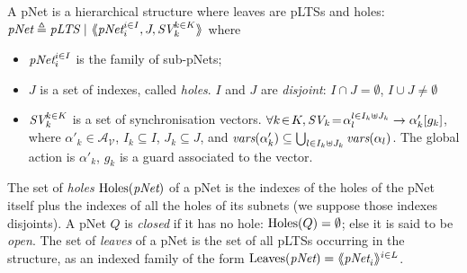 \documentclass{llncs}
\newcommand{\cA}{\ensuremath{\mathcal{A}}}
\newcommand{\cV}{\ensuremath{\mathcal{V}}}
\newcommand{\variables}{\ensuremath{\cV}}
\newcommand{\actions}[1]{\ensuremath{\cA_{#1}}}
\begin{document}
\begin{definition}[pNets]\label{defn:pnets}
A pNet is a hierarchical structure where leaves are pLTSs and holes: %
$\pNet\triangleq \pLTS~|~\mylangle \pNet_i^{i\in I}, J, \symb{SV}_k^{k\in 
K}\myrangle$
where
\begin{itemize}
\item $\pNet_i^{i\in I}$ is the family of sub-pNets;

\item $J$ is a set of indexes, called \emph{holes}.
$I$ and $J$ are \emph{disjoint}: $I\!\cap\! J=\emptyset$,  $I\!\cup\! J\neq\emptyset$

\item $\symb{SV}_k^{k\in K}$ is a set of
  synchronisation vectors. %
$\forall k\!\in\! K,
  \symb{SV}_k\!=\SV{\!\alpha_{l}^{l\in I_k \uplus J_k}}{\alpha'_k}{g_k}$, where
  $\alpha'_k\in \actions{\variables}$, $I_k\subseteq I$, $J_k\subseteq J$, and 
  $\vars(\alpha'_k)\subseteq \bigcup_{l\in I_k\uplus 
  J_k}{\vars({\alpha_l})}$. The global action  is
$\alpha'_k$,  $g_k$ is a guard associated to the vector.


\end{itemize}
The set of \emph{holes} $\Holes(\pNet)$ of a pNet is the indexes of the holes of the pNet 
itself plus the indexes of all the holes of its subnets (we suppose those indexes 
disjoints). A pNet $Q$ is \emph{closed} if it has no hole: $\operatorname{Holes}(Q)=\emptyset$; else it
is said to be \emph{open}.
%
The set of \emph{leaves} of a pNet is the set of all pLTSs occurring in the structure, as an 
indexed family of the form $\Leaves(\pNet)= \mylangle \pNet_i \myrangle^{i \in L}$.

\end{definition}
\end{document}
